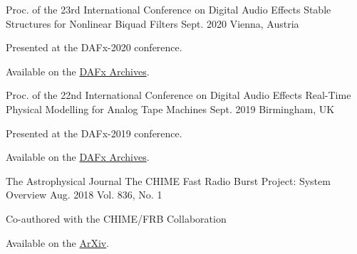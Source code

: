 \begin{cventries}
  \cventry
    {Proc. of the 23rd International Conference on Digital Audio Effects} %
    {Stable Structures for Nonlinear Biquad Filters} %
    {Sept. 2020} %
    {Vienna, Austria} %
    {
      \begin{cvitems} %
        \item {Presented at the DAFx-2020 conference.}
        \item {Available on the \href{https://www.dafx.de/paper-archive/2020/proceedings/papers/DAFx2020_paper_3.pdf}{DAFx Archives}.}
      \end{cvitems}
    }

  \cventry
    {Proc. of the 22nd International Conference on Digital Audio Effects} %
    {Real-Time Physical Modelling for Analog Tape Machines} %
    {Sept. 2019} %
    {Birmingham, UK} %
    {
      \begin{cvitems} %
        \item {Presented at the DAFx-2019 conference.}
        \item {Available on the \href{http://www.dafx.de/paper-archive/2019/DAFx2019_paper_3.pdf}{DAFx Archives}.}
      \end{cvitems}
    }

  \cventry
    {The Astrophysical Journal} %
    {The CHIME Fast Radio Burst Project: System Overview} %
    {Aug. 2018} %
    {Vol. 836, No. 1} %
    {
      \begin{cvitems} %
        \item {Co-authored with the CHIME/FRB Collaboration}
        \item {Available on the \href{https://arxiv.org/abs/1803.11235}{ArXiv}.}
      \end{cvitems}
    }


\end{cventries}
